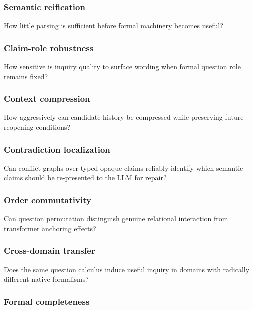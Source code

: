 \documentclass[
]{article}
\begin{document}
\subsubsection{Semantic reification}\label{semantic-reification}

How little parsing is sufficient before formal machinery becomes useful?

\subsubsection{Claim-role robustness}\label{claim-role-robustness}

How sensitive is inquiry quality to surface wording when formal question
role remains fixed?

\subsubsection{Context compression}\label{context-compression}

How aggressively can candidate history be compressed while preserving
future reopening conditions?

\subsubsection{Contradiction
localization}\label{contradiction-localization}

Can conflict graphs over typed opaque claims reliably identify which
semantic claims should be re-presented to the LLM for repair?

\subsubsection{Order commutativity}\label{order-commutativity}

Can question permutation distinguish genuine relational interaction from
transformer anchoring effects?

\subsubsection{Cross-domain transfer}\label{cross-domain-transfer}

Does the same question calculus induce useful inquiry in domains with
radically different native formalisms?

\subsubsection{Formal completeness}\label{formal-completeness}
\end{document}
